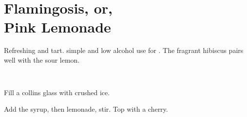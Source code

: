 \section[Flamingosis]{
    Flamingosis, or,\\Pink Lemonade~
}

\begin{recipestats}[
        servings=1,
        preptime=5~\minute,
        original=Mike \& Jane,
    ]
\end{recipestats}

\begin{recipeabstract}
    Refreshing and tart.
    simple and low alcohol use for .
    The fragrant hibiscus pairs well with the sour lemon.
\end{recipeabstract}

\begin{ingredientcolumns}[1]
    \begin{ingredientblock}
        \\
    \end{ingredientblock}
\end{ingredientcolumns}

\begin{preparation}
\item Fill a collins glass with crushed ice.
\item Add the syrup, then lemonade, stir. Top with a cherry.
\end{preparation}

\recipeend%
